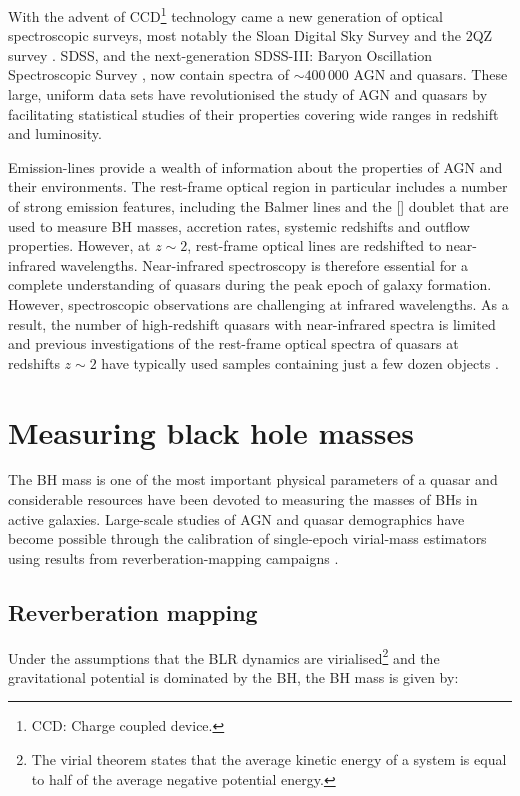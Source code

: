 With the advent of CCD\footnote{CCD: Charge coupled device.} technology came a new generation of optical spectroscopic surveys, most notably the Sloan Digital Sky Survey \citep[SDSS;][]{york00} and the $2$QZ survey \citep{croom04}.
SDSS, and the next-generation SDSS-III: Baryon Oscillation Spectroscopic Survey \citep[BOSS;][]{dawson13}, now contain spectra of $\sim400\,000$ AGN and quasars.
These large, uniform data sets have revolutionised the study of AGN and quasars by facilitating statistical studies of their properties covering wide ranges in redshift and luminosity.

Emission-lines provide a wealth of information about the properties of AGN and their environments.
The rest-frame optical region in particular includes a number of strong emission features, including the Balmer lines and the [] doublet that are used to measure BH masses, accretion rates, systemic redshifts and outflow properties.
However, at $z\sim2$, rest-frame optical lines are redshifted to near-infrared wavelengths.
Near-infrared spectroscopy is therefore essential for a complete understanding of quasars during the peak epoch of galaxy formation.
However, spectroscopic observations are challenging at infrared wavelengths.
As a result, the number of high-redshift quasars with near-infrared spectra is limited and previous investigations of the rest-frame optical spectra of quasars at redshifts $z\sim2$ have typically used samples containing just a few dozen objects \citep[e.g.][]{netzer04,marziani09,shen12,shen16a}.

\section{Measuring black hole masses}

The BH mass is one of the most important physical parameters of a quasar and considerable resources have been devoted to measuring the masses of BHs in active galaxies.
Large-scale studies of AGN and quasar demographics have become possible through the calibration of single-epoch virial-mass estimators using results from reverberation-mapping campaigns \citep[e.g.][]{peterson10,vestergaard11,marziani12,shen13}.

\subsection{Reverberation mapping}

Under the assumptions that the BLR dynamics are virialised\footnote{The virial theorem states that the average kinetic energy of a system is equal to half of the average negative potential energy.} and the gravitational potential is dominated by the BH, the BH mass is given by:

